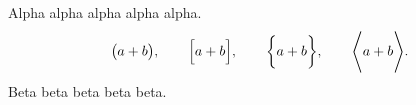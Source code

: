 \documentclass[12pt]{article}
\begin{document}
Alpha alpha alpha alpha alpha.
\[
  \bigl( a + b \bigr), \qquad
  \Bigl[ a + b \Bigr], \qquad
  \biggl\{ a + b \biggr\}, \qquad
  \Biggl\langle a + b \Biggr\rangle.
\]
Beta beta beta beta beta.
\end{document}
